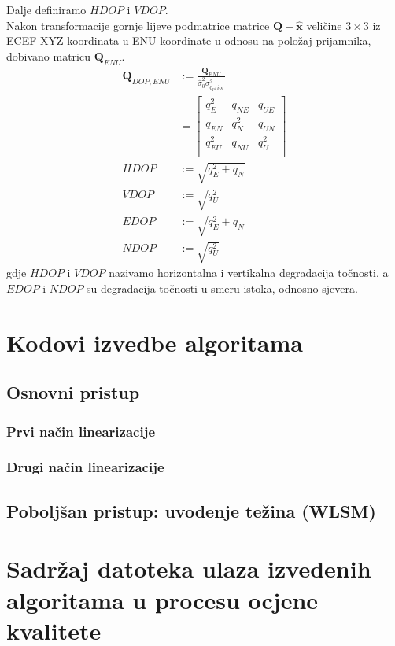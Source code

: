 \documentclass[a4paper,twoside,12pt]{memoir} %
\begin{document}
Dalje definiramo $HDOP$ i $VDOP$. \\
Nakon transformacije gornje lijeve podmatrice matrice $\mathbf{Q-{\hat{x}}}$ veličine $3 \times 3$ iz ECEF XYZ koordinata u ENU koordinate u odnosu na položaj prijamnika, dobivano matricu $\mathbf{Q}_{ENU}$.
\begin{align}
\mathbf{Q}_{DOP,ENU} & := \frac{\mathbf{Q}_{ENU}}{\hat{\sigma}_0^2 \sigma_{0_prior}^2} \\
&=\begin{bmatrix}
q_E^2 & q_{NE} & q_{UE} \\
q_{EN} & q_{N}^2 & q_{UN} \\
q_{EU}^2 & q_{NU} & q_{U}^2 \\
\end{bmatrix}\\
HDOP & := \sqrt{q_E^2 + q_{N}} \\
VDOP & := \sqrt{q_U^2} \\
EDOP & := \sqrt{q_E^2 + q_{N}} \\
NDOP & := \sqrt{q_U^2}
\end{align}
gdje $HDOP$ i $VDOP$ nazivamo horizontalna i vertikalna degradacija točnosti, a
$EDOP$ i $NDOP$ su degradacija točnosti u smeru istoka, odnosno sjevera.

\chapter{Kodovi izvedbe algoritama}\label{appendix:izvedba}
\section{Osnovni pristup}
\subsection{Prvi način linearizacije}
\subsection{Drugi način linearizacije}
\section{Poboljšan pristup: uvođenje težina (WLSM)}
\chapter{Sadržaj datoteka ulaza izvedenih algoritama u procesu ocjene kvalitete}\label{appendix:datotekeUlaza}
\end{document}
